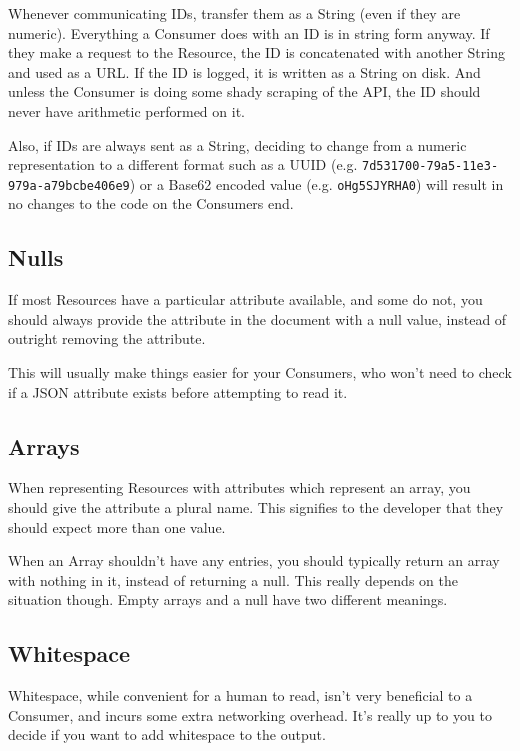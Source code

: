 \documentclass{book}
\begin{document}
Whenever communicating IDs, transfer them as a String (even if they are numeric). Everything a Consumer does with an ID is in string form anyway. If they make a request to the Resource, the ID is concatenated with another String and used as a URL. If the ID is logged, it is written as a String on disk. And unless the Consumer is doing some shady scraping of the API, the ID should never have arithmetic performed on it.

Also, if IDs are always sent as a String, deciding to change from a numeric representation to a different format such as a UUID (e.g. \texttt{7d531700-79a5-11e3-979a-a79bcbe406e9}) or a Base62 encoded value (e.g. \texttt{oHg5SJYRHA0}) will result in no changes to the code on the Consumers end.

\subsection{Nulls}

If most Resources have a particular attribute available, and some do not, you should always provide the attribute in the document with a null value, instead of outright removing the attribute.

This will usually make things easier for your Consumers, who won't need to check if a JSON attribute exists before attempting to read it.

\subsection{Arrays}

When representing Resources with attributes which represent an array, you should give the attribute a plural name. This signifies to the developer that they should expect more than one value.

When an Array shouldn't have any entries, you should typically return an array with nothing in it, instead of returning a null. This really depends on the situation though. Empty arrays and a null have two different meanings.

\subsection{Whitespace}

Whitespace, while convenient for a human to read, isn't very beneficial to a Consumer, and incurs some extra networking overhead. It's really up to you to decide if you want to add whitespace to the output.
\end{document}
